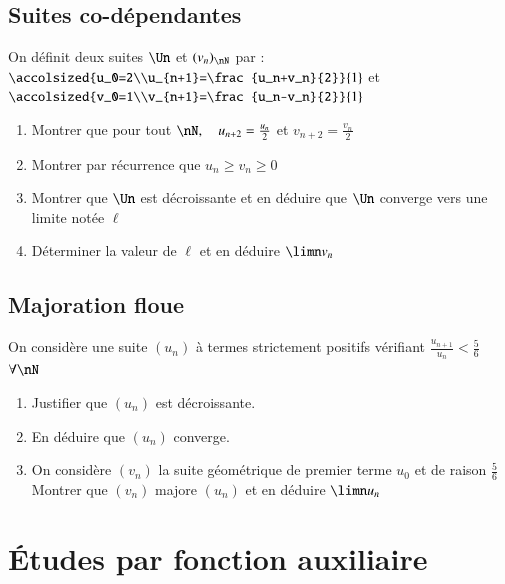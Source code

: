 \documentclass[oneside,12pt]{article}          %
\begin{document}
\subsection{Suites co-dépendantes}
On définit deux suites $\Un$ et $(v_n)_{\nN}$ par : $\accolsized{u_0=2\\u_{n+1}=\frac{u_n+v_n}{2}}{1} $ et $\accolsized{v_0=1\\v_{n+1}=\frac{u_n-v_n}{2}}{1} $
\begin{enumerate}
    \item Montrer que pour tout $\nN,\quad u_{n+2}=\frac{u_n}{2}$ et $v_{n+2}=\frac{v_n}{2}$
    \item Montrer par récurrence que $u_n\geq v_n\geq0$
    \item Montrer que $\Un$ est décroissante et en déduire que $\Un$ converge vers une limite notée $\ell$
    \item Déterminer la valeur de $\ell$ et en déduire $\limn v_n$
\end{enumerate}



\subsection{Majoration floue}
On considère une suite $(u_n)$ à termes strictement positifs vérifiant $\frac{u_{n+1}}{u_n}<\frac{5}{6}$ \quad $\forall\nN$
\begin{enumerate}
	\item Justifier que $(u_n)$ est décroissante.
	\item En déduire que $(u_n)$ converge.
	\item On considère $(v_n)$ la suite géométrique de premier terme $u_0$ et de raison $\frac{5}{6}$\\
	Montrer que $(v_n)$ majore $(u_n)$ et en déduire $\limn u_n$
\end{enumerate}



\section{Études par fonction auxiliaire}
\end{document}
